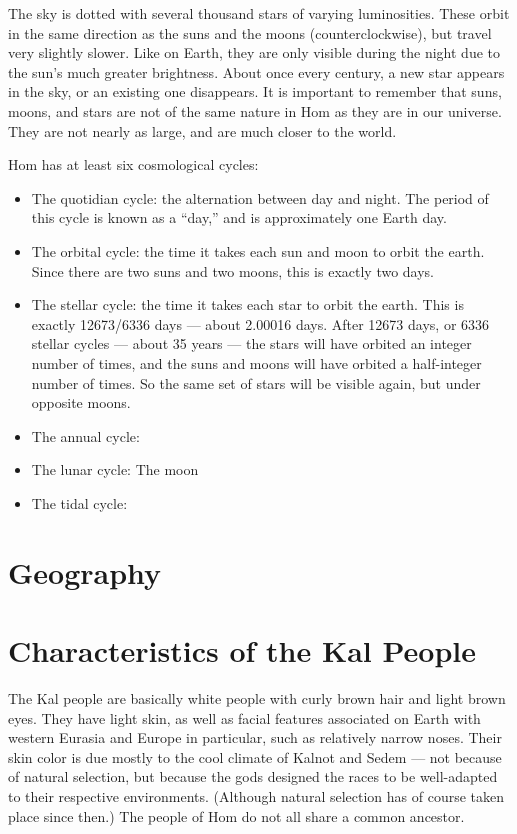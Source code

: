 \documentclass{report}
\begin{document}

The sky is dotted with several thousand stars of varying luminosities. These orbit in the same direction as the suns and the moons (counterclockwise), but travel very slightly slower. Like on Earth, they are only visible during the night due to the sun's much greater brightness. About once every century, a new star appears in the sky, or an existing one disappears. It is important to remember that suns, moons, and stars are not of the same nature in Hom as they are in our universe. They are not nearly as large, and are much closer to the world.

Hom has at least six cosmological cycles:
\begin{itemize}
  \item The quotidian cycle: the alternation between day and night. The period of this cycle is known as a ``day,'' and is approximately one Earth day.
  \item The orbital cycle: the time it takes each sun and moon to orbit the earth. Since there are two suns and two moons, this is exactly two days.
  \item The stellar cycle: the time it takes each star to orbit the earth. This is exactly 12673/6336 days --- about 2.00016 days. After 12673 days, or 6336 stellar cycles --- about 35 years --- the stars will have orbited an integer number of times, and the suns and moons will have orbited a half-integer number of times. So the same set of stars will be visible again, but under opposite moons.  
  \item The annual cycle: %
  \item The lunar cycle: The moon %
  \item The tidal cycle: %
\end{itemize}


\section{Geography}

\section{Characteristics of the Kal People}

The Kal people are basically white people with curly brown hair and light brown eyes. They have light skin, as well as facial features associated on Earth with western Eurasia and Europe in particular, such as relatively narrow noses. Their skin color is due mostly to the cool climate of Kalnot and Sedem --- not because of natural selection, but because the gods designed the races to be well-adapted to their respective environments. (Although natural selection has of course taken place since then.) The people of Hom do not all share a common ancestor.
\end{document}
